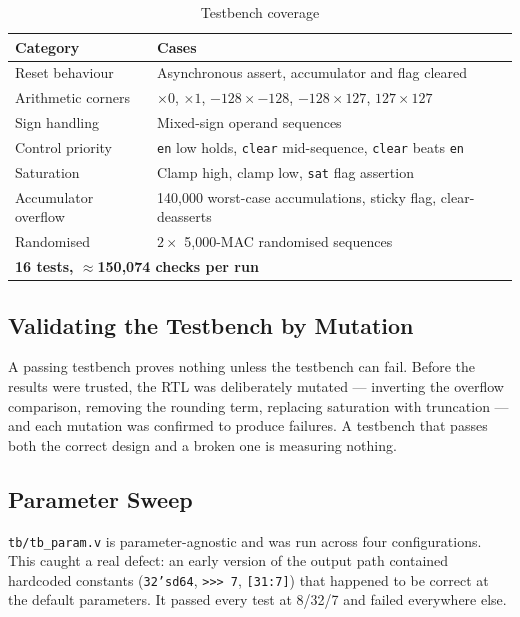 \documentclass[letterpaper,12pt]{article}
\begin{document}
\begin{table}[H]
\centering
\caption{Testbench coverage}
\label{tab:tb}
\renewcommand{\arraystretch}{1.3}
\begin{tabular}{|l|l|}
\hline
\textbf{Category} & \textbf{Cases} \\
\hline
Reset behaviour        & Asynchronous assert, accumulator and flag cleared \\
Arithmetic corners     & $\times 0$, $\times 1$, $-128\times-128$, $-128\times127$, $127\times127$ \\
Sign handling          & Mixed-sign operand sequences \\
Control priority       & \texttt{en} low holds, \texttt{clear} mid-sequence, \texttt{clear} beats \texttt{en} \\
Saturation             & Clamp high, clamp low, \texttt{sat} flag assertion \\
Accumulator overflow   & 140{,}000 worst-case accumulations, sticky flag, clear-deasserts \\
Randomised             & $2\times$ 5{,}000-MAC randomised sequences \\
\hline
\multicolumn{2}{|l|}{\textbf{16 tests, $\approx$150{,}074 checks per run}} \\
\hline
\end{tabular}
\end{table}

\subsection{Validating the Testbench by Mutation}

A passing testbench proves nothing unless the testbench can fail. Before the
results were trusted, the RTL was deliberately mutated --- inverting the
overflow comparison, removing the rounding term, replacing saturation with
truncation --- and each mutation was confirmed to produce failures. A
testbench that passes both the correct design and a broken one is measuring
nothing.

\subsection{Parameter Sweep}

\texttt{tb/tb\_param.v} is parameter-agnostic and was run across four
configurations. This caught a real defect: an early version of the output path
contained hardcoded constants (\texttt{32'sd64}, \texttt{>>> 7},
\texttt{[31:7]}) that happened to be correct at the default parameters. It
passed every test at 8/32/7 and failed everywhere else.
\end{document}
